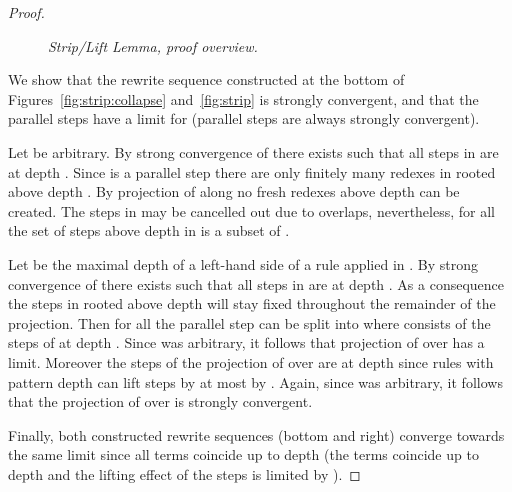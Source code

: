 \begin{proof}
\begin{figure}[hpt!]
\begin{center}
  \end{center}\vspace{-3ex}
  \caption{\textit{Strip/Lift Lemma, proof overview.}}
  \label{fig:strip:proof}
  \end{figure}

  We show that the rewrite sequence constructed at the bottom 
  of Figures~\ref{fig:strip:collapse} and~\ref{fig:strip} is strongly convergent,
  and that the parallel steps  have a limit for 
  (parallel steps are always strongly convergent).

  Let  be arbitrary.
  By strong convergence of  there exists  such that
  all steps in  are at depth .
  Since  is a parallel step there are only finitely many
  redexes  in  rooted above depth .
  By projection of  along 
  no fresh redexes above depth  can be created.
  The steps in  may be cancelled out due to overlaps,
  nevertheless, for all  the set of steps above depth  in 
  is a subset of .

  Let  be the maximal depth of a left-hand side of a rule applied in .
  By strong convergence of  there exists  such that
  all steps in  are at depth .
  As a consequence the steps  in  rooted above depth 
  will stay fixed throughout the remainder of the projection.
  Then for all  the parallel step 
  can be split into 
  where  consists of the steps of  at depth .
  Since  was arbitrary, it follows that projection of  over  has a limit.
  Moreover the steps of the projection of  over 
  are at depth  since rules with pattern depth  can lift steps by at most by .
  Again, since  was arbitrary, it follows that the projection of  over  is strongly convergent.

  Finally, both constructed rewrite sequences (bottom and right) converge towards the same limit 
  since all terms  coincide up to depth 
  (the terms  coincide up to depth  and the lifting effect of the steps  is limited by ).
\end{proof}


